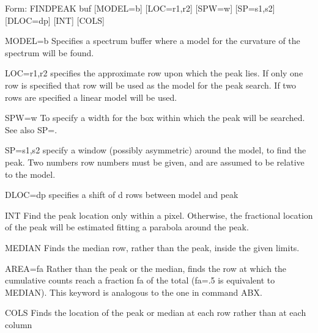 {\newpage\clearpage
{}%
\begin{command}
  \item[Form: FINDPEAK buf {[MODEL=b]} {[LOC=r1,r2]} {[SPW=w]} {[SP=s1,s2]}
       {[DLOC=dp]} {[INT]} {[COLS]}\hfill]{}
  \item[MODEL=b]{Specifies a spectrum buffer where a model for the
       curvature of the spectrum will be found.}
  \item[LOC=r1,r2]{specifies the approximate row upon which the peak lies.
       If only one row is specified that row will be used as
       the model for the peak search. If two rows are specified 
       a linear model will be used.}
  \item[SPW=w]{To specify a width for the box within which the peak
       will be searched. See also SP=.}
  \item[SP=s1,s2]{specify a window (possibly asymmetric) around the model,
       to find the peak. Two numbers row numbers must be given,
       and are assumed to be relative to the model.}
  \item[DLOC=dp]{specifies a shift of d rows between model and peak}
  \item[INT]{Find the peak location only within a pixel. Otherwise,
       the fractional location of the peak will be estimated
       fitting a parabola around the peak.}
  \item[MEDIAN]{Finds the median row, rather than the peak, inside
       the given limits.}
  \item[AREA=fa]{Rather than the peak or the median, finds the row at 
       which the cumulative counts reach a fraction fa of the 
       total (fa=.5 is equivalent to MEDIAN). This keyword is
       analogous to the one in command ABX.}
  \item[COLS]{Finds the location of the peak or median at each row
       rather than at each column}
\end{command}%
\lthtmlfigureZ
\lthtmlcheckvsize\clearpage}

